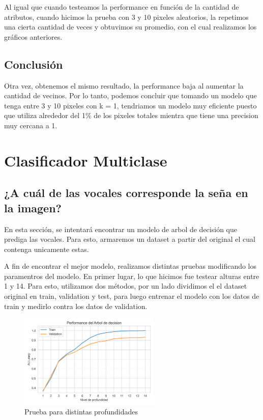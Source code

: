 \documentclass[10pt,a4paper]{article}
\begin{document}
Al igual que cuando testeamos la performance en función de la cantidad de atributos, cuando hicimos la prueba con 3 y 10 pixeles aleatorios, la repetimos una cierta cantidad de veces y obtuvimos su promedio, con el cual realizamos los gráficos anteriores.

\subsection{Conclusión}

Otra vez, obtenemos el mismo resultado, la performance baja al aumentar la cantidad de vecinos. Por lo tanto, podemos concluir que tomando un modelo que tenga entre 3 y 10 pixeles con k = 1, tendriamos un modelo muy eficiente puesto que utiliza alrededor del 1\% de los pixeles totales mientra que tiene una precision muy cercana a 1.

\newpage

\section{Clasificador Multiclase}

\vspace{0.05cm}

\subsection{¿A cuál de las vocales corresponde la seña en la imagen?}

En esta sección, se intentará encontrar un modelo de arbol de decisión que prediga las vocales. Para esto, armaremos un dataset a partir del original el cual contenga unicamente estas. \vspace{0.05cm}

A fin de encontrar el mejor modelo, realizamos distintas pruebas modificando los paramentros del modelo. En primer lugar, lo que hicimos fue testear alturas
entre 1 y 14. Para esto, utilizamos dos métodos, por un lado dividimos el el dataset original en train, validation y test, para luego entrenar
el modelo con los datos de train y medirlo contra los datos de validation. 

\begin{figure}[h]
  \centering
  \includegraphics[width=0.6\textwidth]{Imagenes/primer_prueba_arbol.png}
  \caption{Prueba para distintas profundidades}
  \label{fig:Tabla 1}
\end{figure}
\end{document}
